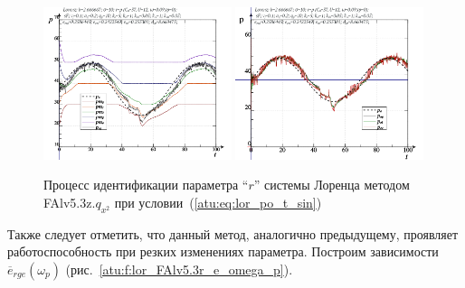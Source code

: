 \begin{figure}[h!]
  \centerline{
    \includegraphics[width=0.49\textwidth]{p/cha/lor/FAlv5.3z/lor_FAlv5_3z_qx2-pl_n_sin.png}
    \hfill
    \includegraphics[width=0.49\textwidth]{p/cha/lor/FAlv5.3z/lor_FAlv5_3z_qx2-p_p_sin.png}
  }
  \caption{Процесс идентификации параметра ``$r$'' системы Лоренца методом FAlv5.3z.$q_{x^2}$ при условии~(\ref{atu:eq:lor_po_t_sin})}
  \label{atu:f:lor_id_FAlv5.3z.q_x2_sin}
\end{figure}

Также следует отметить, что данный метод, аналогично предыдущему,
проявляет работоспособность при резких изменениях параметра.
Построим зависимости
$\overline{e}_{rge}(\omega_p)$ (рис.~\ref{atu:f:lor_FAlv5.3r_e_omega_p}).


